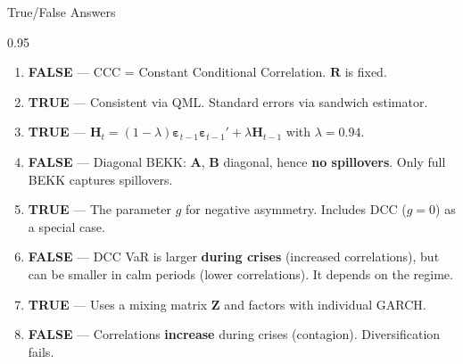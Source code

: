 \documentclass[9pt, aspectratio=169, t]{beamer}
\begin{document}
\begin{frame}{True/False Answers}
    \begin{cminipage}{0.95\textwidth}
    \begin{enumerate}\setlength{\itemsep}{0pt}
        \item \textbf{FALSE} --- CCC = Constant Conditional Correlation. $\mathbf{R}$ is fixed.

        \vspace{0.2cm}

        \item \textbf{TRUE} --- Consistent via QML. Standard errors via sandwich estimator.

        \vspace{0.2cm}

        \item \textbf{TRUE} --- $\mathbf{H}_t = (1-\lambda)\boldsymbol{\varepsilon}_{t-1}\boldsymbol{\varepsilon}_{t-1}' + \lambda\mathbf{H}_{t-1}$ with $\lambda = 0.94$.

        \vspace{0.2cm}

        \item \textbf{FALSE} --- Diagonal BEKK: $\mathbf{A}$, $\mathbf{B}$ diagonal, hence \textbf{no spillovers}. Only full BEKK captures spillovers.

        \vspace{0.2cm}

        \item \textbf{TRUE} --- The parameter $g$ for negative asymmetry. Includes DCC ($g=0$) as a special case.

        \vspace{0.2cm}

        \item \textbf{FALSE} --- DCC VaR is larger \textbf{during crises} (increased correlations), but can be smaller in calm periods (lower correlations). It depends on the regime.

        \vspace{0.2cm}

        \item \textbf{TRUE} --- Uses a mixing matrix $\mathbf{Z}$ and factors with individual GARCH.

        \vspace{0.2cm}

        \item \textbf{FALSE} --- Correlations \textbf{increase} during crises (contagion). Diversification fails.
    \end{enumerate}
    \end{cminipage}
\end{frame}
\end{document}

